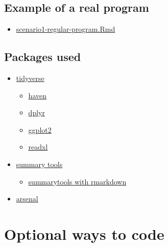 \documentclass[
]{book}
\providecommand{\tightlist}{%
  \setlength{\itemsep}{0pt}\setlength{\parskip}{0pt}}
\begin{document}
\hypertarget{example-of-a-real-program}{%
\subsection{Example of a real program}\label{example-of-a-real-program}}

\begin{itemize}
\tightlist
\item
  \href{scenario1-regular-program.Rmd.txt}{scenario1-regular-program.Rmd}
\end{itemize}

\hypertarget{packages-used}{%
\subsection{Packages used}\label{packages-used}}

\begin{itemize}
\tightlist
\item
  \href{http://www.tidyverse.org/}{tidyverse}

  \begin{itemize}
  \tightlist
  \item
    \href{http://haven.tidyverse.org/}{haven}
  \item
    \href{http://dplyr.tidyverse.org/}{dplyr}
  \item
    \href{http://ggplot2.tidyverse.org/reference/}{ggplot2}
  \item
    \href{http://readxl.tidyverse.org/}{readxl}
  \end{itemize}
\item
  \href{https://cran.r-project.org/web/packages/summarytools/vignettes/Introduction.html}{summary tools}

  \begin{itemize}
  \tightlist
  \item
    \href{https://cran.r-project.org/web/packages/summarytools/vignettes/Recommendations-rmarkdown.html}{summarytools with rmarkdown}
  \end{itemize}
\item
  \href{https://cran.r-project.org/web/packages/arsenal/index.html}{arsenal}
\end{itemize}

\hypertarget{optional-ways-to-code}{%
\section{Optional ways to code}\label{optional-ways-to-code}}
\end{document}
